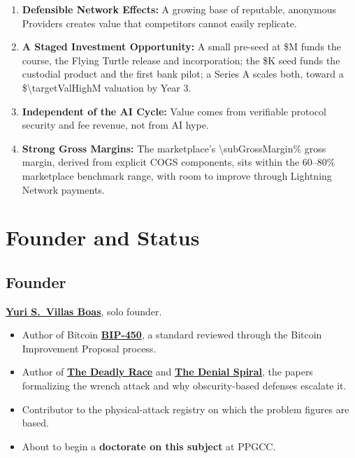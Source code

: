 \begin{enumerate}
    \item \textbf{Defensible Network Effects:} A growing base of reputable, anonymous Providers creates value that competitors cannot easily replicate.

    \item \textbf{A Staged Investment Opportunity:} A small pre-seed at \$M funds the course, the Flying Turtle release and incorporation; the \$K seed funds the custodial product and the first bank pilot; a Series A scales both, toward a \$\num{\targetValHigh}M valuation by Year 3.

    \item \textbf{Independent of the AI Cycle:} Value comes from verifiable protocol security and fee revenue, not from AI hype.

    \item \textbf{Strong Gross Margins:} The marketplace's \num{\subGrossMargin}\% gross margin, derived from explicit COGS components, sits within the 60--80\% marketplace benchmark range, with room to improve through Lightning Network payments.
\end{enumerate}

\section{Founder and Status}\label{sec:founder}

\subsection{Founder}
\textbf{\href{https://linktr.ee/yurisvb}{Yuri S.\ Villas Boas}}, solo founder.
\begin{itemize}
    \item Author of Bitcoin \textbf{\href{\bipurl}{BIP-450}}, a standard reviewed through the Bitcoin Improvement Proposal process.
    \item Author of \textbf{\href{\drurl}{The Deadly Race}} and \textbf{\href{\dsurl}{The Denial Spiral}}, the papers formalizing the wrench attack and why obscurity-based defenses escalate it.
    \item Contributor to the physical-attack registry on which the problem figures are based.
    \item About to begin a \textbf{doctorate on this subject} at PPGCC.
\end{itemize}


